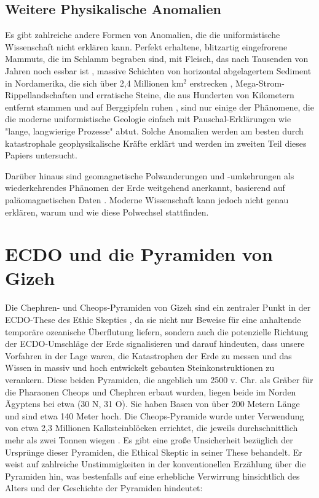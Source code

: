 \documentclass[10pt,twocolumn,letterpaper]{article}
\begin{document}
\subsection{Weitere Physikalische Anomalien}

Es gibt zahlreiche andere Formen von Anomalien, die die uniformistische Wissenschaft nicht erklären kann. Perfekt erhaltene, blitzartig eingefrorene Mammuts, die im Schlamm begraben sind, mit Fleisch, das nach Tausenden von Jahren noch essbar ist \cite{17,18,19}, massive Schichten von horizontal abgelagertem Sediment in Nordamerika, die sich über 2,4 Millionen km$^2$ erstrecken \cite{21}, Mega-Strom-Rippellandschaften \cite{22} und erratische Steine, die aus Hunderten von Kilometern entfernt stammen und auf Berggipfeln ruhen \cite{23,26}, sind nur einige der Phänomene, die die moderne uniformistische Geologie einfach mit Pauschal-Erklärungen wie "lange, langwierige Prozesse" abtut. Solche Anomalien werden am besten durch katastrophale geophysikalische Kräfte erklärt und werden im zweiten Teil dieses Papiers untersucht.

Darüber hinaus sind geomagnetische Polwanderungen und -umkehrungen als wiederkehrendes Phänomen der Erde weitgehend anerkannt, basierend auf paläomagnetischen Daten \cite{35,40,41}. Moderne Wissenschaft kann jedoch nicht genau erklären, warum und wie diese Polwechsel stattfinden.

\section{ECDO und die Pyramiden von Gizeh}

Die Chephren- und Cheops-Pyramiden von Gizeh sind ein zentraler Punkt in der ECDO-These des Ethic Skeptics \cite{27}, da sie nicht nur Beweise für eine anhaltende temporäre ozeanische Überflutung liefern, sondern auch die potenzielle Richtung der ECDO-Umschläge der Erde signalisieren und darauf hindeuten, dass unsere Vorfahren in der Lage waren, die Katastrophen der Erde zu messen und das Wissen in massiv und hoch entwickelt gebauten Steinkonstruktionen zu verankern. Diese beiden Pyramiden, die angeblich um 2500 v. Chr. als Gräber für die Pharaonen Cheops und Chephren erbaut wurden, liegen beide im Norden Ägyptens bei etwa (30 N, 31 O). Sie haben Basen von über 200 Metern Länge und sind etwa 140 Meter hoch. Die Cheops-Pyramide wurde unter Verwendung von etwa 2,3 Millionen Kalksteinblöcken errichtet, die jeweils durchschnittlich mehr als zwei Tonnen wiegen \cite{24, 25}.
Es gibt eine große Unsicherheit bezüglich der Ursprünge dieser Pyramiden, die Ethical Skeptic in seiner These behandelt. Er weist auf zahlreiche Unstimmigkeiten in der konventionellen Erzählung über die Pyramiden hin, was bestenfalls auf eine erhebliche Verwirrung hinsichtlich des Alters und der Geschichte der Pyramiden hindeutet:
\end{document}
